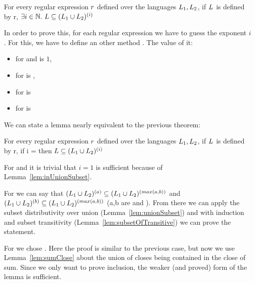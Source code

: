 \begin{theorem}
	For every regular expression $r$ defined over the languages $L_{1}, L_{2}$, if $L_{}$ is defined by r, $\exists i \in \mathbb{N}. ~ L \subseteq (L_{1} \cup L_{2})^{(i)}$
\end{theorem}

In order to prove this, for each regular expression we have to guess the exponent $i$. For this, we have to define an other method . The value of it:

\begin{itemize}
	\item for  and  is $1$,
	\item for  is ,
	\item for  is  
	\item for  is  
\end{itemize}

We can state a lemma nearly equivalent to the previous theorem:
\begin{lemma}
	\label{lem:regexSubsetStar}
	For every regular expression $r$ defined over the languages $L_{1}, L_{2}$, if $L_{}$ is defined by r, if i =  then $L \subseteq (L_{1} \cup L_{2})^{(i)}$
\end{lemma}

For  and  it is trivial that $i=1$ is sufficient because of Lemma~\ref{lem:inUnionSubset}.

For  we can say that $(L_{1} \cup L_{2})^{(a)} \subseteq (L_{1} \cup L_{2})^{(max(a,b))}$ and $(L_{1} \cup L_{2})^{(b)} \subseteq (L_{1} \cup L_{2})^{(max(a,b))}$ (a,b are  and ). From there we can apply the subset distributivity over union (Lemma~\ref{lem:unionSubset}) and with induction and subset transitivity (Lemma~\ref{lem:subsetOfTransitive}) we can prove the statement.

For  we chose . Here the proof is similar to the previous case, but now we use Lemma~\ref{lem:sumClose} about the union of closes being contained in the close of sum. Since we only want to prove inclusion, the weaker (and proved) form of the lemma is sufficient.

